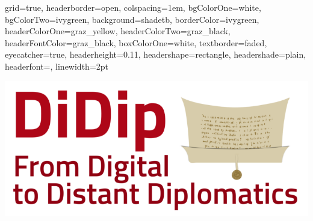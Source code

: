 \documentclass[a0paper,portrait]{baposter}
\begin{document}
\begin{poster} %
{
grid=true, %
headerborder=open, %
colspacing=1em, %
bgColorOne=white, %
bgColorTwo=ivygreen, %
background=shadetb, %
borderColor=ivygreen, %
headerColorOne=graz_yellow, %
headerColorTwo=graz_black, %
headerFontColor=graz_black, %
boxColorOne=white, %
textborder=faded, %
eyecatcher=true, %
headerheight=0.11\textheight, %
headershape=rectangle, %
headershade=plain,
headerfont=\Large\textsf, %
linewidth=2pt %
}
{\begin{minipage}{.125\linewidth}
	\includegraphics[width=\linewidth]{didip_sm.png}


\end{minipage}}
\end{poster}
\end{document}
